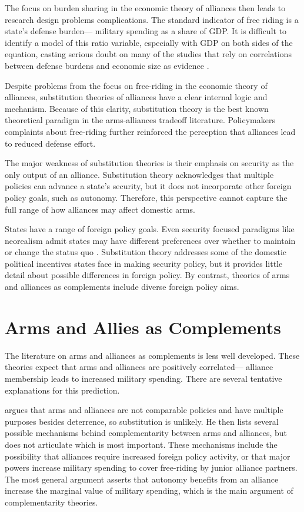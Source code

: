 \documentclass[12pt]{article}
\begin{document}
The focus on burden sharing in the economic theory of alliances then leads to research design problems complications. The standard indicator of free riding is a state's defense burden--- military spending as a share of GDP. It is difficult to identify a model of this ratio variable, especially with GDP on both sides of the equation, casting serious doubt on many of the studies that rely on correlations between defense burdens and economic size as evidence \citep{PluemperNeumayer2015}. 

Despite problems from the focus on free-riding in the economic theory of alliances, substitution theories of alliances have a clear internal logic and mechanism. Because of this clarity, substitution theory is the best known theoretical paradigm in the arms-alliances tradeoff literature. Policymakers complaints about free-riding further reinforced the perception that alliances lead to reduced defense effort. 

The major weakness of substitution theories is their emphasis on security as the only output of an alliance. Substitution theory acknowledges that multiple policies can advance a state's security, but it does not incorporate other foreign policy goals, such as autonomy. Therefore, this perspective cannot capture the full range of how alliances may affect domestic arms. 

States have a range of foreign policy goals. Even security focused paradigms like neorealism admit states may have different preferences over whether to maintain or change the status quo \citep{Schweller1994, Walt2009}. Substitution theory addresses some of the domestic political incentives states face in making security policy, but it provides little detail about possible differences in foreign policy. By contrast, theories of arms and alliances as complements include diverse foreign policy aims. 


\section*{Arms and Allies as Complements}

The literature on arms and alliances as complements is less well developed. These theories expect that arms and alliances are positively correlated--- alliance membership leads to increased military spending. There are several tentative explanations for this prediction.

\citet{Diehl1994} argues that arms and alliances are not comparable policies and have multiple purposes besides deterrence, so substitution is unlikely. He then lists several possible mechanisms behind complementarity between arms and alliances, but does not articulate which is most important. These mechanisms include the possibility that alliances require increased foreign policy activity, or that major powers increase military spending to cover free-riding by junior alliance partners. The most general argument asserts that autonomy benefits from an alliance increase the marginal value of military spending, which is the main argument of complementarity theories. 
\end{document}
